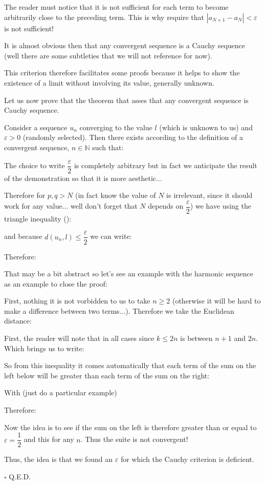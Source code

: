 	The reader must notice that it is not sufficient for each term to become arbitrarily close to the preceding term. This is why require that $|a_{N+1} - a_{N}| < \varepsilon$ is not sufficient!

	It is almost obvious then that any convergent sequence is a Cauchy sequence (well there are some subtleties that we will not reference for now).

	\begin{tcolorbox}[title=Remark,colframe=black,arc=10pt]
This criterion therefore facilitates some proofs because it helps to show the existence of a limit without involving its value, generally unknown.
	\end{tcolorbox}
	
	\begin{theorem}
	Let us now prove that the theorem that asses that any convergent sequence is Cauchy sequence.
	\end{theorem}
	\begin{dem}
	Consider a sequence $u_n$ converging to the value $l$ (which is unknown to us) and $\varepsilon>0$ (randomly selected). Then there exists according to the definition of a convergent sequence, $n \in \mathbb{N}$ such that:
	
	The choice to write $\dfrac{\varepsilon}{2}$ is completely arbitrary but in fact we anticipate the result of the demonstration so that it is more aesthetic...
	
	Therefore for $p,q>N$ (in fact know the value of $N$ is irrelevant, since it should work for any value... well don't forget that $N$ depends on $\dfrac{\varepsilon}{2}$) we have using the triangle inequality ():
	
	and because $d(u_n,l)\leq\dfrac{\varepsilon}{2}$ we can write:
	
	Therefore:
	
	That may be a bit abstract so let's see an example with the harmonic sequence as an example to close the proof:
	
	First, nothing it is not vorbidden to us to take $n \geq 2$ (otherwise it will be hard to make a difference between two terms...).
	Therefore we take the Euclidean distance:
	
	First, the reader will note that in all cases since $k\leq 2n$ is between $n+1$ and $2n$. Which brings us to write:
	
	So from this inequality it comes automatically that each term of the sum on the left below will be greater than each term of the sum on the right:
	
	With (just do a particular example)
	
	Therefore:
		
	Now the idea is to see if the sum on the left is therefore greater than or equal to $\varepsilon=\dfrac{1}{2}$ and this for any $n$. Thus the suite is not convergent!
	
	Thus, the idea is that we found an $\varepsilon$ for which the Cauchy criterion is deficient.
	\begin{flushright}
		$\square$  Q.E.D.
	\end{flushright}
	\end{dem}

